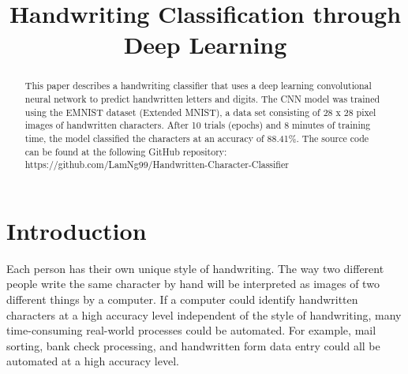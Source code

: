 \documentclass[conference]{IEEEtran}
\begin{document}
\title{Handwriting Classification through Deep Learning
}

\author{
\and
{}
\and
{}

}

\maketitle

\begin{abstract}

This paper describes a handwriting classifier that uses a deep learning convolutional neural network to predict handwritten letters and digits. The CNN model was trained using the EMNIST dataset (Extended MNIST), a data set consisting of 28 x 28 pixel images of handwritten characters. After 10 trials (epochs) and 8 minutes of training time, the model classified the characters at an accuracy of 88.41\%. The source code can be found at the following GitHub repository: https://github.com/LamNg99/Handwritten-Character-Classifier

\end{abstract}

\section{Introduction}

Each person has their own unique style of handwriting. The way two different people write the same character by hand will be interpreted as images of two different things by a computer. If a computer could identify handwritten characters at a high accuracy level independent of the style of handwriting, many time-consuming real-world processes could be automated. For example, mail sorting, bank check processing, and handwritten form data entry could all be automated at a high accuracy level.
\end{document}
